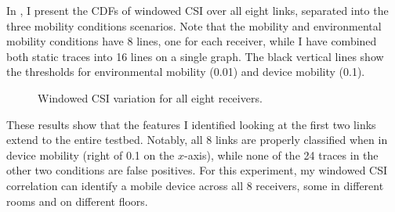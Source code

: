 In , I present the CDFs of windowed CSI over all eight links, separated into the three mobility conditions scenarios. Note that the mobility and environmental mobility conditions have 8 lines, one for each receiver, while I have combined both static traces into 16 lines on a single graph. The black vertical lines show the thresholds for environmental mobility (0.01) and device mobility (0.1).

\begin{figure}[htbp]
	\centering
	\hspace{0.03\textwidth}%
	\hspace{0.03\textwidth}%
	\caption[Windowed CSI variation for all eight receivers]{\label{fig:mobility_csi_alllinks_cdf}Windowed CSI variation for all eight receivers.}
\end{figure}

These results show that the features I identified looking at the first two links extend to the entire testbed. Notably, all 8 links are properly classified when in device mobility (right of 0.1 on the $x$-axis), while none of the 24 traces in the other two conditions are false positives. For this experiment, my windowed CSI correlation can identify a mobile device across all 8 receivers, some in different rooms and on different floors.

